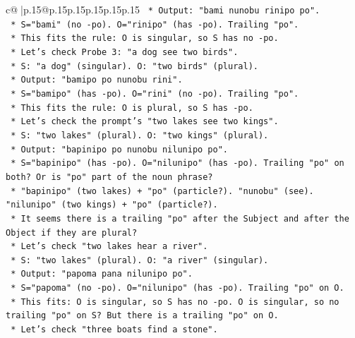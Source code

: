 \documentclass{article}
\begin{document}
{\begin{supertabular}{c@{$\;$}|p{.15\linewidth}@{}p{.15\linewidth}p{.15\linewidth}p{.15\linewidth}p{.15\linewidth}p{.15\linewidth}}
{{{\texttt{                    *   Output: "bami nunobu rinipo po".} \\
\texttt{                    *   S="bami" (no {-}po). O="rinipo" (has {-}po). Trailing "po".} \\
\texttt{                    *   This fits the rule: O is singular, so S has no {-}po.} \\
\texttt{                *   Let's check Probe 3: "a dog see two birds".} \\
\texttt{                    *   S: "a dog" (singular). O: "two birds" (plural).} \\
\texttt{                    *   Output: "bamipo po nunobu rini".} \\
\texttt{                    *   S="bamipo" (has {-}po). O="rini" (no {-}po). Trailing "po".} \\
\texttt{                    *   This fits the rule: O is plural, so S has {-}po.} \\
\texttt{                *   Let's check the prompt's "two lakes see two kings".} \\
\texttt{                    *   S: "two lakes" (plural). O: "two kings" (plural).} \\
\texttt{                    *   Output: "bapinipo po nunobu nilunipo po".} \\
\texttt{                    *   S="bapinipo" (has {-}po). O="nilunipo" (has {-}po). Trailing "po" on both? Or is "po" part of the noun phrase?} \\
\texttt{                    *   "bapinipo" (two lakes) + "po" (particle?). "nunobu" (see). "nilunipo" (two kings) + "po" (particle?).} \\
\texttt{                    *   It seems there is a trailing "po" after the Subject and after the Object if they are plural?} \\
\texttt{                *   Let's check "two lakes hear a river".} \\
\texttt{                    *   S: "two lakes" (plural). O: "a river" (singular).} \\
\texttt{                    *   Output: "papoma pana nilunipo po".} \\
\texttt{                    *   S="papoma" (no {-}po). O="nilunipo" (has {-}po). Trailing "po" on O.} \\
\texttt{                    *   This fits: O is singular, so S has no {-}po. O is singular, so no trailing "po" on S? But there is a trailing "po" on O.} \\
\texttt{                *   Let's check "three boats find a stone".} \\
}}}
\end{supertabular}}
\end{document}
